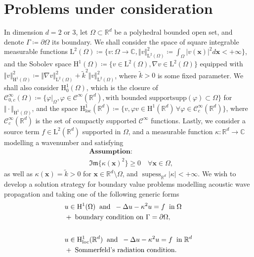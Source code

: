 \documentclass[a4paper,11pt]{article}
\newcommand{\RR}{\mathbb{R}}
\newcommand{\CC}{\mathbb{C}}
\newcommand{\mrm}{\mathrm}
\newcommand{\mL}{\mathrm{L}}
\newcommand{\mH}{\mathrm{H}}
\newcommand{\bx}{\boldsymbol{x}}
\renewcommand{\Im}{\mathfrak{Im}} %
\begin{document}
\section{Problems under consideration}\label{sec:pbs}
In dimension $d=2$ or $3$, let $\Omega\subset \RR^d$ be a polyhedral
bounded open set, and denote $\Gamma \coloneq \partial\Omega$ its
boundary. We shall consider the space of square integrable measurable
functions $\mL^{2}(\Omega)\coloneq\{ v\colon\Omega\to \CC, \Vert
v\Vert_{\mL^{2}(\Omega)}^{2}\coloneq \int_{\Omega}\vert
v(\bx)\vert^{2} d\bx <+\infty\}$, and the Sobolev space
$\mH^{1}(\Omega)\coloneq\{ v\in \mL^{2}(\Omega), \nabla v\in
\mL^{2}(\Omega)\}$ equipped with $\Vert
v\Vert_{\mH^{1}(\Omega)}^{2}\coloneq \Vert \nabla
v\Vert_{\mL^{2}(\Omega)}^{2}+ \tilde{k}^{2}\Vert
v\Vert_{\mL^{2}(\Omega)}^2$, where $\tilde{k}>0$ is some fixed
parameter. We shall also consider $\mH^{1}_0(\Omega)$, which is the
closure of
$\mathscr{C}^{\infty}_{0,c}(\Omega)\coloneq\{\varphi\vert_{\Omega},
\varphi\in \mathscr{C}^{\infty}(\RR^d), \text{with bounded support
}\mrm{supp}(\varphi)\subset \Omega\}$ for $\Vert
\cdot\Vert_{\mH^{1}(\Omega)}$, and the space
$\mH^{1}_{\text{loc}}(\RR^d) \coloneq \{v, \varphi v \in
\mH^{1}(\RR^d) \,\forall \varphi \in
\mathscr{C}^{\infty}_{c}(\RR^d)\}$, where
$\mathscr{C}^{\infty}_{c}(\RR^d)$ is the set of compactly supported
$\mathscr{C}^{\infty}$ functions. Lastly, we consider a source term $f\in
\mL^{2}(\RR^d)$ supported in $\Omega$, and a measurable function 
$\kappa\colon\RR^d\to \CC$ modelling a wavenumber and satisfying
\begin{equation}\label{Assumption1}
  \begin{aligned}
    & \textbf{Assumption:}\\
    & \Im\{\kappa(\bx)^2\}\geq 0 \quad \forall \bx\in\Omega,
  \end{aligned}
\end{equation} 
as well as $\kappa(\bx) = \tilde{k}>0$ for $\bx\in
\RR^d\setminus\Omega$, and $\mathop{\sup\text{ess}}_{\RR^d}\vert \kappa\vert <+\infty$.
We wish to develop a solution strategy for boundary value problems
modelling acoustic wave propagation and taking one of the following
generic forms
\begin{subequations}\label{IntialBVP}
  \begin{align}
  & \begin{aligned}
    & u\in \mH^{1}(\Omega)\;\;\text{and}\;\; -\Delta u-\kappa^{2}u = f\;\;\text{in}\;\Omega\\
    & +\;\text{boundary condition on }\Gamma = \partial\Omega,
  \end{aligned} \label{IntialBVPa}\\
  \notag\\
  & \begin{aligned}
    & u\in \mH^{1}_{\text{loc}}(\RR^d)\;\;\text{and}\;\; -\Delta u-\kappa^{2}u = f\;\;\text{in}\;\RR^d\\
    & +\;\text{Sommerfeld's radiation condition}.
  \end{aligned} \label{IntialBVPb}
  \end{align}
\end{subequations}
\end{document}
